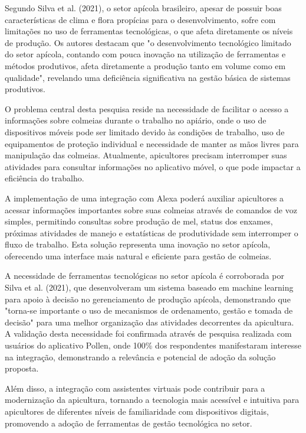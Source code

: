 Segundo Silva et al. (2021), o setor apícola brasileiro, apesar de possuir boas características de clima e flora propícias para o desenvolvimento, 
sofre com limitações no uso de ferramentas tecnológicas, o que afeta diretamente os níveis de produção. Os autores destacam que 
"o desenvolvimento tecnológico limitado do setor apícola, contando com pouca inovação na utilização de ferramentas e métodos produtivos, 
afeta diretamente a produção tanto em volume como em qualidade", revelando uma deficiência significativa na gestão básica de sistemas produtivos.

O problema central desta pesquisa reside na necessidade de facilitar o acesso a informações sobre colmeias durante o trabalho no apiário, 
onde o uso de dispositivos móveis pode ser limitado devido às condições de trabalho, uso de equipamentos de proteção individual 
e necessidade de manter as mãos livres para manipulação das colmeias. Atualmente, apicultores precisam interromper suas atividades 
para consultar informações no aplicativo móvel, o que pode impactar a eficiência do trabalho.

A implementação de uma integração com Alexa poderá auxiliar apicultores a acessar informações importantes sobre suas colmeias 
através de comandos de voz simples, permitindo consultas sobre produção de mel, status dos enxames, próximas atividades de manejo 
e estatísticas de produtividade sem interromper o fluxo de trabalho. Esta solução representa uma inovação no setor apícola, 
oferecendo uma interface mais natural e eficiente para gestão de colmeias. 

A necessidade de ferramentas tecnológicas no setor apícola é corroborada por Silva et al. (2021), que desenvolveram um sistema baseado em 
machine learning para apoio à decisão no gerenciamento de produção apícola, demonstrando que "torna-se importante o uso de mecanismos de 
ordenamento, gestão e tomada de decisão" para uma melhor organização das atividades decorrentes da apicultura. A validação desta necessidade 
foi confirmada através de pesquisa realizada com usuários do aplicativo Pollen, onde 100\% dos respondentes manifestaram interesse na integração, 
demonstrando a relevância e potencial de adoção da solução proposta.

Além disso, a integração com assistentes virtuais pode contribuir para a modernização da apicultura, 
tornando a tecnologia mais acessível e intuitiva para apicultores de diferentes níveis de familiaridade com dispositivos digitais, 
promovendo a adoção de ferramentas de gestão tecnológica no setor.



